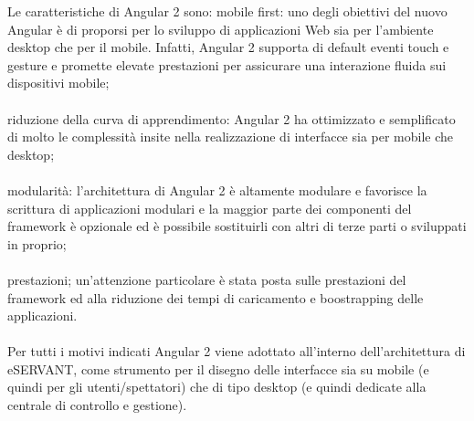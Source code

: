 Le caratteristiche di Angular 2 sono:
mobile first: uno degli obiettivi del nuovo Angular è di proporsi per lo
sviluppo di applicazioni Web sia per l’ambiente desktop che per il mobile.
Infatti, Angular 2 supporta di default eventi touch e gesture e promette
elevate prestazioni per assicurare una interazione fluida sui dispositivi
mobile;
\paragraph{}

riduzione della curva di apprendimento: Angular 2 ha ottimizzato e
semplificato di molto le complessità insite nella realizzazione di interfacce
sia per mobile che desktop;
\paragraph{}

modularità: l’architettura di Angular 2 è altamente modulare e favorisce la
scrittura di applicazioni modulari e la maggior parte dei componenti del
framework è opzionale ed è possibile sostituirli con altri di terze parti o
sviluppati in proprio;
\paragraph{}

prestazioni; un’attenzione particolare è stata posta sulle prestazioni del
framework ed alla riduzione dei tempi di caricamento e boostrapping delle
applicazioni.
\paragraph{}

Per tutti i motivi indicati Angular 2 viene adottato all’interno dell’architettura di
eSERVANT, come strumento per il disegno delle interfacce sia su mobile (e quindi per
gli utenti/spettatori) che di tipo desktop (e quindi dedicate alla centrale di controllo e
gestione).
\paragraph{}